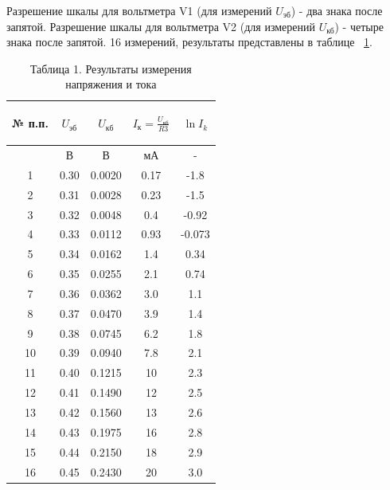 Разрешение шкалы для вольтметра V1 (для измерений $U_{\text{эб}}$) - два знака после запятой. Разрешение шкалы для вольтметра V2 (для измерений $U_{\text{кб}}$) - четыре знака после запятой. 16 измерений, результаты представлены в таблице ~\ref{tabl:1}.

\begin{center}
\begin{table}[h!]
\centering
\caption*{Таблица 1. Результаты измерения напряжения и тока}

\label{tabl:1}
\begin{tabular}{|c|c|c|c|c|}
\hline
\begin{minipage}{7mm}
    № п.п. 
\end{minipage}&
\begin{minipage}{3cm}
    \begin{center} $U_{\text{эб}}$ \end{center}
\end{minipage} &
\begin{minipage}{3cm}
    \begin{center} $U_{\text{кб}}$ \end{center}
\end{minipage} &
\begin{minipage}{3cm}
    \begin{center} $I_{\text{к}}=\frac{U_{\text{кб}}}{R3}$ \end{center}
\end{minipage}&
\begin{minipage}{3cm}
   \begin{center} $\ln I_k$ \end{center}
\end{minipage}\\
\hline
{}&В&В&мА&-\\
\hline
1 &  0.30  &  0.0020  &  0.17 & -1.8 \\
2 &  0.31  &  0.0028  & 0.23  & -1.5 \\
3 &  0.32  &  0.0048  &  0.4 & -0.92\\
4 & 0.33  &  0.0112  &  0.93 & -0.073\\
5 & 0.34  &  0.0162  &  1.4 & 0.34\\
6 & 0.35  &  0.0255  &  2.1 & 0.74\\
7 & 0.36  &  0.0362  &  3.0 & 1.1\\
8 & 0.37  &  0.0470  &  3.9 & 1.4\\
9& 0.38  &  0.0745  &   6.2 & 1.8\\
10 &  0.39  &  0.0940  &  7.8 &  2.1\\
11 &  0.40  &  0.1215  &  10 & 2.3\\
12 &  0.41  & 0.1490 &  12 & 2.5\\
13 & 0.42 &  0.1560  &  13 & 2.6\\
14 & 0.43  &  0.1975  &  16 & 2.8\\
15 & 0.44  &  0.2150  & 18  & 2.9\\
16 & 0.45  &  0.2430  &  20 & 3.0\\
\hline
\end{tabular}
\end{table}
\end{center}


